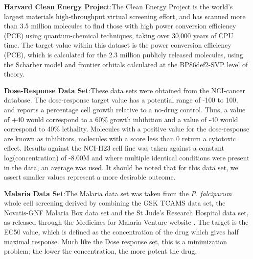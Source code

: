 \documentclass{pnastwo}
\begin{document}
\begin{article}
\textbf{Harvard Clean Energy Project}:The Clean Energy Project is the world's largest materials high-throughput virtual screening effort\cite{hachmann_lead_2014,hachmann_harvard_2011}, and has scanned more than 3.5 million molecules to find those with high power conversion efficiency (PCE) using quantum-chemical techniques, taking over 30,000 years of CPU time. The target value within this dataset is the power conversion efficiency (PCE), which is calculated for the 2.3 million publicly released molecules, using the Scharber model\cite{scharber_design_2006} and frontier orbitals calculated at the BP86\cite{perdew_density-functional_1986,becke_densityfunctional_1993}\/def2-SVP\cite{weigend_balanced_2005} level of theory.


\textbf{Dose-Response Data Set}:These data sets were obtained from the NCI-cancer database\cite{_nci_}.  The dose-response target value has a potential range of -100 to 100, and reports a percentage cell growth relative to a no-drug control.  Thus, a value of +40 would correspond to a 60\% growth inhibition and a value of -40 would correspond to 40\% lethality.  Molecules with a positive value for the dose-response are known as inhibitors, molecules with a score less than 0 return a cytotoxic effect. Results against the NCI-H23 cell line was taken against a constant log(concentration) of -8.00M and where multiple identical conditions were present in the data, an average was used.  It should be noted that for this data set, we assert smaller values represent a more desirable outcome. 


\textbf{Malaria Data Set}:The Malaria data set was taken from the \textit{P. falciparum} whole cell screening derived by combining the GSK TCAMS data set, the Novatis-GNF Malaria Box data set and the St Jude's Research Hospital data set, as released through the Medicines for Malaria Venture website \cite{23798988}.  The target is the EC50 value, which is defined as the concentration of the drug which gives half maximal response.  Much like the Dose response set, this is a minimization problem; the lower the concentration, the more potent the drug.


\end{article}
\end{document}
